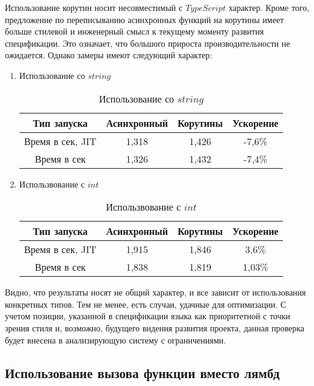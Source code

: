 \documentclass{mipt-thesis-bs}
\begin{document}
Использование корутин носит несовместимый с $TypeScript$ характер. Кроме того,
предложение по переписыванию асинхронных функций на корутины имеет больше стилевой
и инженерный смысл к текущему моменту развития спецификации. Это означает, что
большого прироста производительности не ожидается. Однако замеры имеют следующий характер:

\begin{enumerate}
    \item Использование со $string$
    \begin{table}[h]
        \centering
        \begin{tabular}{|c|c|c|c|}
          \hline
          Тип запуска & Асинхронный & Корутины & Ускорение \\
          \hline
          Время в сек, JIT & 1,318 & 1,426 & -7,6\% \\
          \hline
          Время в сек & 1,326 & 1,432 & -7,4\% \\
          \hline
        \end{tabular}
        \caption{Использование со $string$}
      \end{table}
    \item Использвование с $int$
    \begin{table}[h]
        \centering
        \begin{tabular}{|c|c|c|c|}
          \hline
          Тип запуска & Асинхронный & Корутины & Ускорение \\
          \hline
          Время в сек, JIT & 1,915 & 1,846 & 3,6\% \\
          \hline
          Время в сек & 1,838 & 1,819 & 1,03\% \\
          \hline
        \end{tabular}
        \caption{Использвование с $int$}
      \end{table}
\end{enumerate}

Видно, что результаты носят не общий характер, и все зависит от использования
конкретных типов. Тем не менее, есть случаи, удачные для оптимизации. С учетом
позиции, указанной в спецификации языка как приоритетной с точки зрения стиля и,
возможно, будущего видения развития проекта, данная проверка будет внесена в
анализирующую систему с ограничениями.

\subsection{Использование вызова функции вместо лямбд}
\end{document}
